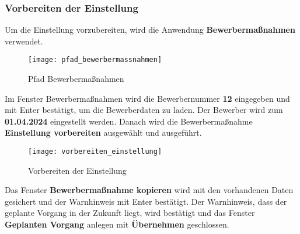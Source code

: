 \subsubsection{Vorbereiten der Einstellung}
Um die Einstellung vorzubereiten, wird die Anwendung \textbf{Bewerbermaßnahmen} verwendet.
\begin{figure}[H]
	\centering
	\texttt{[image: pfad\_bewerbermassnahmen]}
	\caption{Pfad Bewerbermaßnahmen}
	\label{fig:pfad_bewerbermassnahmen}
\end{figure}
Im Fenster Bewerbermaßnahmen wird die Bewerbernummer \textbf{12} eingegeben und mit Enter bestätigt, um die Bewerberdaten zu laden. Der Bewerber wird zum \textbf{01.04.2024} eingestellt werden. Danach wird die Bewerbermaßnahme \textbf{Einstellung vorbereiten} ausgewählt und ausgeführt.
\begin{figure}[H]
	\centering
	\texttt{[image: vorbereiten\_einstellung]}
	\caption{Vorbereiten der Einstellung}
	\label{fig:vorbereiten_einstellung}
\end{figure}
Das Fenster \textbf{Bewerbermaßnahme kopieren} wird mit den vorhandenen Daten gesichert und der Warnhinweis mit Enter bestätigt. Der Warnhinweis, dass der geplante Vorgang in der Zukunft liegt, wird bestätigt und das Fenster \textbf{Geplanten Vorgang} anlegen mit \textbf{Übernehmen} geschlossen.

